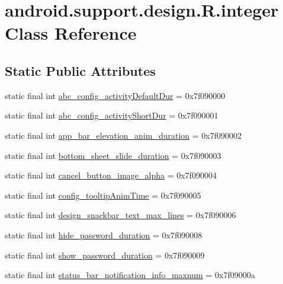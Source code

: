\hypertarget{classandroid_1_1support_1_1design_1_1R_1_1integer}{}\section{android.\+support.\+design.\+R.\+integer Class Reference}
\label{classandroid_1_1support_1_1design_1_1R_1_1integer}
\subsection*{Static Public Attributes}
\begin{DoxyCompactItemize}
\item 
static final int \mbox{\hyperlink{classandroid_1_1support_1_1design_1_1R_1_1integer_ab0c8a771ad2ae3aba6dc8d9823755f3e}{abc\+\_\+config\+\_\+activity\+Default\+Dur}} = 0x7f090000
\item 
static final int \mbox{\hyperlink{classandroid_1_1support_1_1design_1_1R_1_1integer_a5cc6424d72a443bb45486cf8746b7bc1}{abc\+\_\+config\+\_\+activity\+Short\+Dur}} = 0x7f090001
\item 
static final int \mbox{\hyperlink{classandroid_1_1support_1_1design_1_1R_1_1integer_a0ccf14317bb3c589aa527685fa603dba}{app\+\_\+bar\+\_\+elevation\+\_\+anim\+\_\+duration}} = 0x7f090002
\item 
static final int \mbox{\hyperlink{classandroid_1_1support_1_1design_1_1R_1_1integer_a9232e8a7524ef36aadf986b2ac0d61a4}{bottom\+\_\+sheet\+\_\+slide\+\_\+duration}} = 0x7f090003
\item 
static final int \mbox{\hyperlink{classandroid_1_1support_1_1design_1_1R_1_1integer_a3b9b1c57b76ebfa9f445b3f40ee6f2ad}{cancel\+\_\+button\+\_\+image\+\_\+alpha}} = 0x7f090004
\item 
static final int \mbox{\hyperlink{classandroid_1_1support_1_1design_1_1R_1_1integer_ade6fb0e33173bce29fca86fc670d1169}{config\+\_\+tooltip\+Anim\+Time}} = 0x7f090005
\item 
static final int \mbox{\hyperlink{classandroid_1_1support_1_1design_1_1R_1_1integer_a938a7c8efcde243e2e8cf2089e78f7f0}{design\+\_\+snackbar\+\_\+text\+\_\+max\+\_\+lines}} = 0x7f090006
\item 
static final int \mbox{\hyperlink{classandroid_1_1support_1_1design_1_1R_1_1integer_ac0c8d73bfaf81079f1472fd3154aae8b}{hide\+\_\+password\+\_\+duration}} = 0x7f090008
\item 
static final int \mbox{\hyperlink{classandroid_1_1support_1_1design_1_1R_1_1integer_a10ce8bfe10cb0e779af49220383e052c}{show\+\_\+password\+\_\+duration}} = 0x7f090009
\item 
static final int \mbox{\hyperlink{classandroid_1_1support_1_1design_1_1R_1_1integer_a4b128748dfc77dbedbe2c85115af5a64}{status\+\_\+bar\+\_\+notification\+\_\+info\+\_\+maxnum}} = 0x7f09000a
\end{DoxyCompactItemize}


